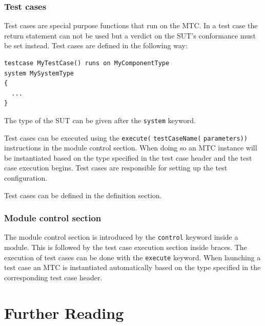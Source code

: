 \documentclass[a4paper]{article}
\begin{document}
\subsubsection{Test cases}
Test cases are special purpose functions that run on the MTC. In a test case the return statement can not be used but a
verdict on the SUT's conformance must be set instead. Test cases are defined in the following way:
{\footnotesize
\begin{lstlisting}
testcase MyTestCase() runs on MyComponentType
system MySystemType
{
  ...
}
\end{lstlisting}
}
The type of the SUT can be given after the \verb.system. keyword.

Test cases can be executed using the \verb/execute(/ \verb/testCaseName(/
\verb/parameters))/ instructions in the module control section. When doing so an MTC instance will be
instantiated based on the type specified in the test case header and the test case execution begins. Test cases are
responsible for setting up the test configuration.

Test cases can be defined in the definition section.

\subsubsection{Module control section}

The module control section is introduced by the \verb/control/ keyword inside a module. This is followed
by the test case execution section inside braces. The execution of test cases can be done with the
\verb/execute/ keyword. When launching a test case an MTC is instantiated automatically based on the type
specified in the corresponding test case header.



\section{Further Reading}
\end{document}
